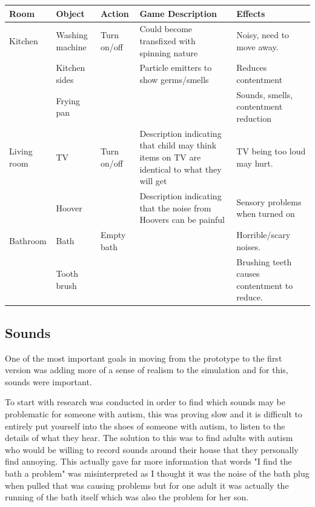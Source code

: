 \documentclass[11pt]{report}
\begin{document}
\begin{table}[H]
    \begin{tabular}{| p{2cm} | p{2cm} | p{3cm} | p{3cm} | p{4cm} | }
    \hline
    Room & Object & Action & Game Description & Effects                                                                  \\
    \hline
    \hline
        Kitchen & Washing machine & Turn on/off & Could become transfixed with spinning nature & Noisy, need to move away. \\
    \hline
    & Kitchen sides & & Particle emitters to show germs/smells & Reduces contentment \\
    \hline
    & Frying pan & & & Sounds, smells, contentment reduction \\
    \hline
    Living room & TV & Turn on/off & Description indicating that child may think items on TV are identical to what they will get & TV being too loud may hurt. \\
    \hline
    & Hoover & & Description indicating that the noise from Hoovers can be painful & Sensory problems when turned on \\
    \hline
    Bathroom & Bath & Empty bath & & Horrible/scary noises. \\
    \hline
    & Tooth brush & & & Brushing teeth causes contentment to reduce. \\
    \hline
    \end{tabular}
\end{table}

\subsection{Sounds}
One of the most important goals in moving from the prototype to the first version was adding more of a sense of realism to the simulation and for this, sounds were important.

To start with research was conducted in order to find which sounds may be problematic for someone with autism, this was proving slow and it is difficult to entirely put yourself into the shoes of someone with autism, to listen to the details of what they hear. The solution to this was to find adults with autism who would be willing to record sounds around their house that they personally find annoying. This actually gave far more information that words "I find the bath a problem" was misinterpreted as I thought it was the noise of the bath plug when pulled that was causing problems but for one adult it was actually the running of the bath itself which was also the problem for her son.
\end{document}
